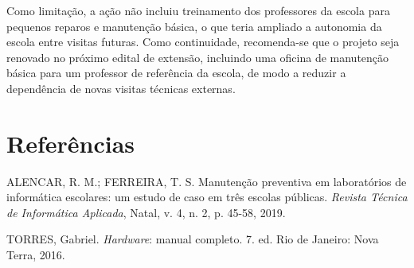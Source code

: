 \documentclass[article,12pt,a4paper,oneside]{abntex2}
\begin{document}
Como limitação, a ação não incluiu treinamento dos professores da escola
para pequenos reparos e manutenção básica, o que teria ampliado a
autonomia da escola entre visitas futuras. Como continuidade, recomenda-se
que o projeto seja renovado no próximo edital de extensão, incluindo uma
oficina de manutenção básica para um professor de referência da escola,
de modo a reduzir a dependência de novas visitas técnicas externas.

\postextual

\section*{Referências}

\newcommand{\referencia}[1]{\par\noindent\hangindent=1cm #1\par\medskip}

\referencia{ALENCAR, R. M.; FERREIRA, T. S. Manutenção preventiva em
laboratórios de informática escolares: um estudo de caso em três escolas
públicas. \textit{Revista Técnica de Informática Aplicada}, Natal, v. 4,
n. 2, p. 45-58, 2019.}

\referencia{TORRES, Gabriel. \textit{Hardware}: manual completo. 7. ed. Rio
de Janeiro: Nova Terra, 2016.}
\end{document}
